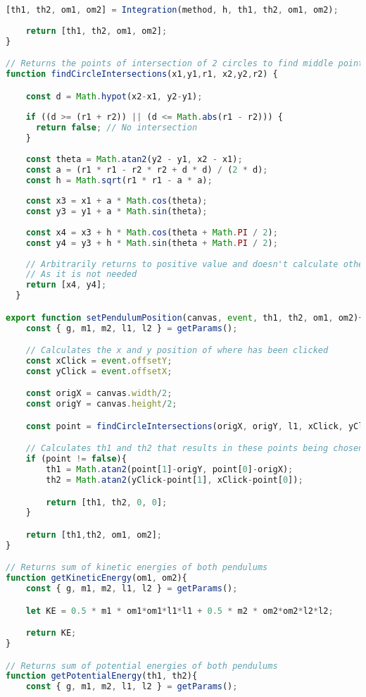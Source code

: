 \documentclass[12pt]{article}
\begin{document}
\begin{lstlisting}[language=JavaScript]
    [th1, th2, om1, om2] = Integration(method, h, th1, th2, om1, om2);
    
    return [th1, th2, om1, om2];
}

// Returns the points of intersection of 2 circles to find middle point
function findCircleIntersections(x1,y1,r1, x2,y2,r2) {

    const d = Math.hypot(x2-x1, y2-y1);
  
    if ((d >= (r1 + r2)) || (d <= Math.abs(r1 - r2))) {
      return false; // No intersection
    }
  
    const theta = Math.atan2(y2 - y1, x2 - x1);
    const a = (r1 * r1 - r2 * r2 + d * d) / (2 * d);
    const h = Math.sqrt(r1 * r1 - a * a);
  
    const x3 = x1 + a * Math.cos(theta);
    const y3 = y1 + a * Math.sin(theta);
  
    const x4 = x3 + h * Math.cos(theta + Math.PI / 2);
    const y4 = y3 + h * Math.sin(theta + Math.PI / 2);
  
    // Arbitrarily returns to positive value and doesn't calculate other intersection
    // As it is not needed
    return [x4, y4];
  }

export function setPendulumPosition(canvas, event, th1, th2, om1, om2){
    const { g, m1, m2, l1, l2 } = getParams();

    // Calculates the x and y position of where has been clicked
    const xClick = event.offsetY;
    const yClick = event.offsetX;

    const origX = canvas.width/2;
    const origY = canvas.height/2;

    const point = findCircleIntersections(origX, origY, l1, xClick, yClick, l2);

    // Calculates th1 and th2 that results in these points being chosen
    if (point != false){
        th1 = Math.atan2(point[1]-origY, point[0]-origX);
        th2 = Math.atan2(yClick-point[1], xClick-point[0]);

        return [th1, th2, 0, 0];
    }

    return [th1,th2, om1, om2];
}

// Returns sum of kinetic energies of both pendulums
function getKineticEnergy(om1, om2){
    const { g, m1, m2, l1, l2 } = getParams();

    let KE = 0.5 * m1 * om1*om1*l1*l1 + 0.5 * m2 * om2*om2*l2*l2;

    return KE;
}

// Returns sum of potential energies of both pendulums
function getPotentialEnergy(th1, th2){
    const { g, m1, m2, l1, l2 } = getParams();


\end{lstlisting}
\end{document}
